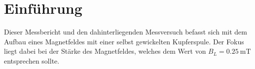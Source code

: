 \documentclass[../main.tex]{subfiles}
\begin{document}
\section{Einführung}
Dieser Messbericht und den dahinterliegenden Messversuch befasst sich mit dem Aufbau eines Magnetfeldes mit einer selbst gewickelten Kupferspule. Der Fokus liegt dabei bei der Stärke des Magnetfeldes, welches dem Wert von $B_L = \SI{0.25}{\milli\tesla}$ entsprechen sollte.
\end{document}
